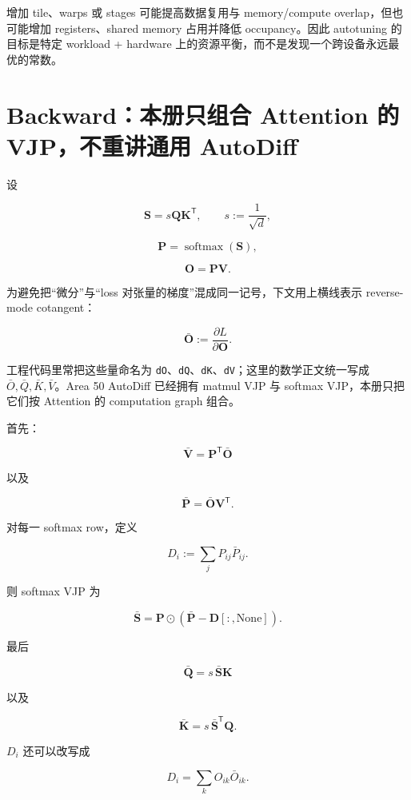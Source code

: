 \documentclass[profile=standard,twoside=false]{ipara-handbook}
\begin{document}
增加 tile、warps 或 stages 可能提高数据复用与 memory/compute overlap，但也可能增加 registers、shared memory 占用并降低 occupancy。因此 autotuning 的目标是特定 workload + hardware 上的资源平衡，而不是发现一个跨设备永远最优的常数。

\section{Backward：本册只组合 Attention 的 VJP，不重讲通用 AutoDiff}

设

$$
\boldsymbol{S}=s\boldsymbol{Q}\boldsymbol{K}^{\mathsf T},
\qquad
s:=\frac{1}{\sqrt d},
$$

$$
\boldsymbol{P}=\operatorname{softmax}(\boldsymbol{S}),
$$

$$
\boldsymbol{O}=\boldsymbol{P}\boldsymbol{V}.
$$

为避免把“微分”与“loss 对张量的梯度”混成同一记号，下文用上横线表示 reverse-mode cotangent：

$$
\bar{\boldsymbol{O}}
:=\frac{\partial L}{\partial\boldsymbol{O}}.
$$

工程代码里常把这些量命名为 \texttt{dO}、\texttt{dQ}、\texttt{dK}、\texttt{dV}；这里的数学正文统一写成 $\bar O,\bar Q,\bar K,\bar V$。Area 50 AutoDiff 已经拥有 matmul VJP 与 softmax VJP，本册只把它们按 Attention 的 computation graph 组合。

首先：

$$
\boxed{
\bar{\boldsymbol{V}}
=\boldsymbol{P}^{\mathsf T}\bar{\boldsymbol{O}}
}
$$

以及

$$
\boxed{
\bar{\boldsymbol{P}}
=\bar{\boldsymbol{O}}\boldsymbol{V}^{\mathsf T}
}.
$$

对每一 softmax row，定义

$$
D_i
:=\sum_jP_{ij}\bar P_{ij}.
$$

则 softmax VJP 为

$$
\boxed{
\bar{\boldsymbol{S}}
=\boldsymbol{P}\odot
\left(
\bar{\boldsymbol{P}}-\boldsymbol{D}[:,\mathrm{None}]
\right)
}.
$$

最后

$$
\boxed{
\bar{\boldsymbol{Q}}
=s\,\bar{\boldsymbol{S}}\boldsymbol{K}
}
$$

以及

$$
\boxed{
\bar{\boldsymbol{K}}
=s\,\bar{\boldsymbol{S}}^{\mathsf T}\boldsymbol{Q}
}.
$$

$D_i$ 还可以改写成

$$
\boxed{
D_i
=\sum_k O_{ik}\bar O_{ik}
}.
$$
\end{document}
